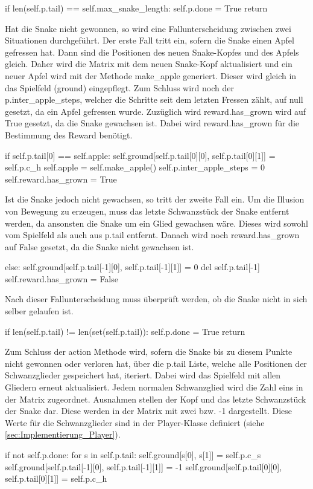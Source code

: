 \begin{python}
	 if len(self.p.tail) == self.max_snake_length:
		self.p.done = True
		return
\end{python}
Hat die Snake nicht gewonnen, so wird eine Fallunterscheidung zwischen zwei Situationen durchgeführt. Der erste Fall tritt ein, sofern die Snake einen Apfel gefressen hat. Dann sind die Positionen des neuen Snake-Kopfes und des Apfels gleich. Daher wird die Matrix mit dem neuen Snake-Kopf aktualisiert und ein neuer Apfel wird mit der Methode make\_apple generiert. Dieser wird gleich in das Spielfeld (ground) eingepflegt. Zum Schluss wird noch der p.inter\_apple\_steps, welcher die Schritte seit dem letzten Fressen zählt, auf null gesetzt, da ein Apfel gefressen wurde. Zuzüglich wird reward.has\_grown wird auf True gesetzt, da die Snake gewachsen ist. Dabei wird reward.has\_grown für die Bestimmung des Reward benötigt.
\begin{python}
	if self.p.tail[0] == self.apple:
		self.ground[self.p.tail[0][0], self.p.tail[0][1]] = self.p.c_h
		self.apple = self.make_apple()
		self.p.inter_apple_steps = 0
		self.reward.has_grown = True
\end{python}
Ist die Snake jedoch nicht gewachsen, so tritt der zweite Fall ein. Um die Illusion von Bewegung zu erzeugen, muss das letzte Schwanzstück der Snake entfernt werden, da ansonsten die Snake um ein Glied gewachsen wäre. Dieses wird sowohl vom Spielfeld als auch aus p.tail entfernt. Danach wird noch reward.has\_grown auf False gesetzt, da die Snake nicht gewachsen ist.
\begin{python}
	else:
		self.ground[self.p.tail[-1][0], self.p.tail[-1][1]] = 0
		del self.p.tail[-1]
		self.reward.has_grown = False
\end{python}
Nach dieser Fallunterscheidung muss überprüft werden, ob die Snake nicht in sich selber gelaufen ist.
\begin{python}
	if len(self.p.tail) != len(set(self.p.tail)):
		self.p.done = True
		return
\end{python}
Zum Schluss der action Methode wird, sofern die Snake bis zu diesem Punkte nicht gewonnen oder verloren hat, über die p.tail Liste, welche alle Positionen der Schwanzglieder gespeichert hat, iteriert. Dabei wird das Spielfeld mit allen Gliedern erneut aktualisiert. Jedem normalen Schwanzglied wird die Zahl eins in der Matrix zugeordnet. Ausnahmen stellen der Kopf und das letzte Schwanzstück der Snake dar. Diese werden in der Matrix mit zwei bzw. -1 dargestellt. Diese Werte für die Schwanzglieder sind in der Player-Klasse definiert (siehe \ref{sec:Implementierung_Player}).
\begin{python}
	if not self.p.done:
		for s in self.p.tail:
			self.ground[s[0], s[1]] = self.p.c_s
		self.ground[self.p.tail[-1][0], self.p.tail[-1][1]] = -1
		self.ground[self.p.tail[0][0], self.p.tail[0][1]] = self.p.c_h
\end{python}

